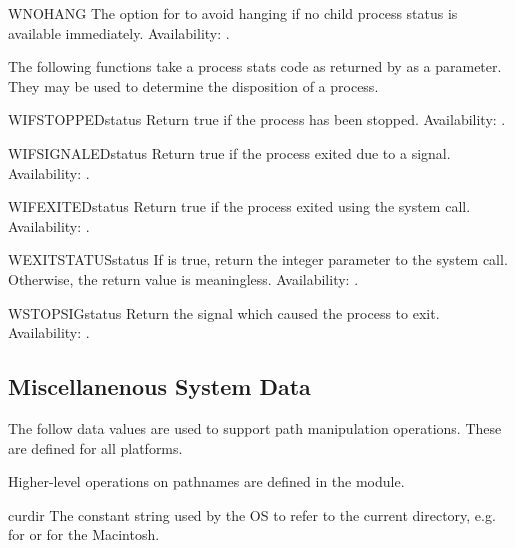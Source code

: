 \begin{datadesc}{WNOHANG}
The option for  to avoid hanging if no child
process status is available immediately.
Availability: \UNIX{}.
\end{datadesc}

The following functions take a process stats code as returned by
 as a parameter.  They may be used to determine
the disposition of a process.

\begin{funcdesc}{WIFSTOPPED}{status}
Return true if the process has been stopped.
Availability: \UNIX{}.
\end{funcdesc}

\begin{funcdesc}{WIFSIGNALED}{status}
Return true if the process exited due to a signal.
Availability: \UNIX{}.
\end{funcdesc}

\begin{funcdesc}{WIFEXITED}{status}
Return true if the process exited using the  system
call.
Availability: \UNIX{}.
\end{funcdesc}

\begin{funcdesc}{WEXITSTATUS}{status}
If  is true, return the integer
parameter to the  system call.  Otherwise, the return 
value is meaningless.
Availability: \UNIX{}.
\end{funcdesc}

\begin{funcdesc}{WSTOPSIG}{status}
Return the signal which caused the process to exit.
Availability: \UNIX{}.
\end{funcdesc}


\subsection{Miscellanenous System Data \label{os-path}}

The follow data values are used to support path manipulation
operations.  These are defined for all platforms.

Higher-level operations on pathnames are defined in the
 module.


\begin{datadesc}{curdir}
The constant string used by the OS to refer to the current directory,
e.g.\  for \POSIX{} or  for the Macintosh.
\end{datadesc}

